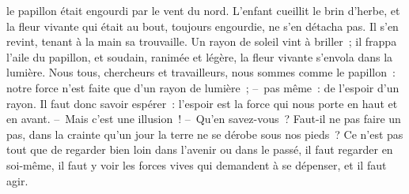 \documentclass[french,twoside]{book} %
\begin{document}
le papillon était engourdi par le vent du nord. L’enfant cueillit le brin d’herbe, et la fleur vivante qui était au bout, toujours engourdie, ne s’en détacha pas. Il s’en revint, tenant à la main sa trouvaille. Un rayon de soleil vint à briller ; il frappa l’aile du papillon, et soudain, ranimée et légère, la fleur vivante s’envola dans la lumière. Nous tous, chercheurs et travailleurs, nous sommes comme le papillon : notre force n’est faite que d’un rayon de lumière ; – pas même : de l’espoir d’un rayon. Il faut donc savoir espérer : l’espoir est la force qui nous porte en haut et en avant. – Mais c’est une illusion ! – Qu’en savez-vous ? Faut-il ne pas faire un pas, dans la crainte qu’un jour la terre ne se dérobe sous nos pieds ? Ce n’est pas tout que de regarder bien loin dans l’avenir ou dans le passé, il faut regarder en soi-même, il faut y voir les forces vives qui demandent à se dépenser, et il faut agir.
\end{document}
